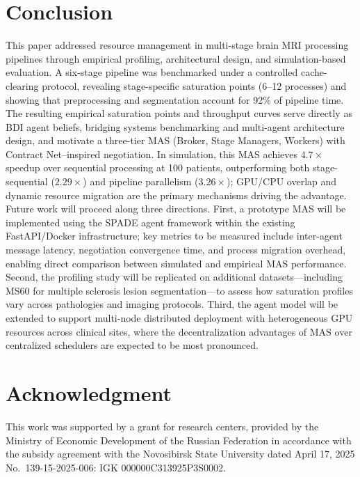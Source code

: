 \documentclass[conference]{IEEEtran}
\begin{document}
\section{Conclusion}

This paper addressed resource management in multi-stage brain MRI processing pipelines through empirical profiling, architectural design, and simulation-based evaluation. A six-stage pipeline was benchmarked under a controlled cache-clearing protocol, revealing stage-specific saturation points (6--12 processes) and showing that preprocessing and segmentation account for 92\% of pipeline time. The resulting empirical saturation points and throughput curves serve directly as BDI agent beliefs, bridging systems benchmarking and multi-agent architecture design, and motivate a three-tier MAS (Broker, Stage Managers, Workers) with Contract Net--inspired negotiation. In simulation, this MAS achieves $4.7\times$ speedup over sequential processing at 100 patients, outperforming both stage-sequential ($2.29\times$) and pipeline parallelism ($3.26\times$); GPU/CPU overlap and dynamic resource migration are the primary mechanisms driving the advantage. Future work will proceed along three directions. First, a prototype MAS will be implemented using the SPADE agent framework within the existing FastAPI/Docker infrastructure; key metrics to be measured include inter-agent message latency, negotiation convergence time, and process migration overhead, enabling direct comparison between simulated and empirical MAS performance. Second, the profiling study will be replicated on additional datasets---including MS60 for multiple sclerosis lesion segmentation---to assess how saturation profiles vary across pathologies and imaging protocols. Third, the agent model will be extended to support multi-node distributed deployment with heterogeneous GPU resources across clinical sites, where the decentralization advantages of MAS over centralized schedulers are expected to be most pronounced.

\section*{Acknowledgment}

This work was supported by a grant for research centers, provided by the Ministry of Economic Development of the Russian Federation in accordance with the subsidy agreement with the Novosibirsk State University dated April 17, 2025 No.~139-15-2025-006: IGK 000000C313925P3S0002.
\end{document}
